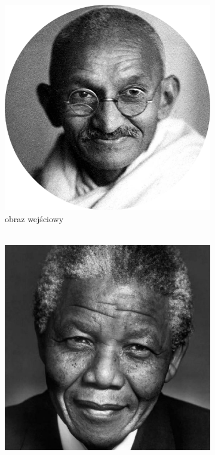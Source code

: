     	\begin{figure}[H] 
        \centering
        \begin{subfigure}{0.24\textwidth}
            \centering
            \includegraphics[width = \textwidth]{img/6-comp/gandhi_original_c10_inv0.png}
            \caption{obraz wejściowy\\\hphantom{ }\\\hphantom{ }}
            \label{comp-comp-gandhi-mandela-a}
        \end{subfigure}
        \begin{subfigure}{0.24\textwidth}
            \centering
            \includegraphics[width = \textwidth]{img/6-comp/mandela_original_c10_inv0.png}

\end{subfigure}
\end{figure}
